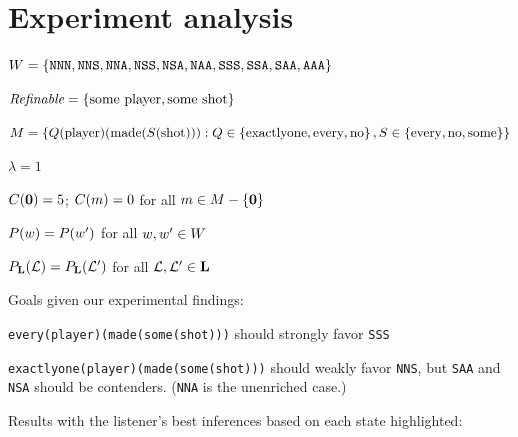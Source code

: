 \documentclass{article}
\begin{document}
\newpage

\section{Experiment analysis}

\begin{examples}
\item

 \begin{examples}
  \item $W = \left\{ \texttt{NNN}, \texttt{NNS}, \texttt{NNA}, \texttt{NSS}, \texttt{NSA}, \texttt{NAA}, \texttt{SSS}, \texttt{SSA}, \texttt{SAA}, \texttt{AAA} \right\}$    
  \item $\textit{Refinable} = \left\{ \text{some player}, \text{some shot} \right\}$
  \item $M = \left\{ Q(\text{player})(\text{made}(S(\text{shot}))) : Q \in \left\{ \text{exactlyone}, \text{every}, \text{no} \right\}, S \in  \left\{ \text{every}, \text{no}, \text{some} \right\} \right\}$
  \item $\lambda = 1$
  \item $C(\mathbf{0}) = 5$; $C(m) = 0$ for all $m \in M-\left\{ \mathbf{0} \right\}$  
  \item $P(w) = P(w')$ for all $w, w' \in W$
  \item $P_{\mathbf{L}}(\mathcal{L}) = P_{\mathbf{L}}(\mathcal{L}')$ for all $\mathcal{L}, \mathcal{L}' \in \mathbf{L}$
  \end{examples}

\item Goals given our experimental findings:
  \begin{examples}
  \item \texttt{every(player)(made(some(shot)))} should strongly favor \texttt{SSS}
  \item \texttt{exactlyone(player)(made(some(shot)))} should weakly favor \texttt{NNS}, but \texttt{SAA} and \texttt{NSA} should be contenders.
    (\texttt{NNA} is the unenriched case.)
  \end{examples}


\item Results with the listener's best inferences based on each state
  highlighted:


\end{examples}
\end{document}
